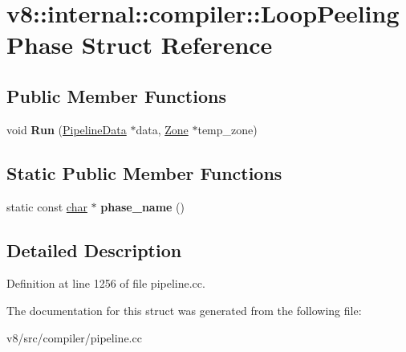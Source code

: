 \hypertarget{structv8_1_1internal_1_1compiler_1_1LoopPeelingPhase}{}\section{v8\+:\+:internal\+:\+:compiler\+:\+:Loop\+Peeling\+Phase Struct Reference}
\label{structv8_1_1internal_1_1compiler_1_1LoopPeelingPhase}
\subsection*{Public Member Functions}
\begin{DoxyCompactItemize}
\item 
\mbox{\label{structv8_1_1internal_1_1compiler_1_1LoopPeelingPhase_acd09b364c4893124b4deaceecb654f8f}} 
void {\bfseries Run} (\mbox{\hyperlink{classv8_1_1internal_1_1compiler_1_1PipelineData}{Pipeline\+Data}} $\ast$data, \mbox{\hyperlink{classv8_1_1internal_1_1Zone}{Zone}} $\ast$temp\+\_\+zone)
\end{DoxyCompactItemize}
\subsection*{Static Public Member Functions}
\begin{DoxyCompactItemize}
\item 
\mbox{\label{structv8_1_1internal_1_1compiler_1_1LoopPeelingPhase_a9fb86a0918d1ccb0ea2b45570639f8cb}} 
static const \mbox{\hyperlink{classchar}{char}} $\ast$ {\bfseries phase\+\_\+name} ()
\end{DoxyCompactItemize}


\subsection{Detailed Description}


Definition at line 1256 of file pipeline.\+cc.



The documentation for this struct was generated from the following file\+:\begin{DoxyCompactItemize}
\item 
v8/src/compiler/pipeline.\+cc\end{DoxyCompactItemize}
